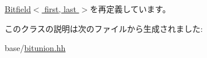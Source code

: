 \hyperlink{classBitfieldBackend_1_1RegularBitfieldTypes_1_1Bitfield_a89ce74f3480b6d588fa6e042d8753675}{Bitfield$<$ first, last $>$}を再定義しています。

このクラスの説明は次のファイルから生成されました:\begin{DoxyCompactItemize}
\item 
base/\hyperlink{bitunion_8hh}{bitunion.hh}\end{DoxyCompactItemize}
